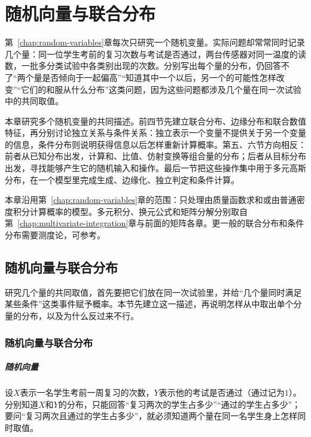 \chapter{随机向量与联合分布}
\label{chap:random-vectors}
\label{chap:probability-theory}

第~\ref{chap:random-variables}章每次只研究一个随机变量。实际问题却常常同时记录几个量：同一位学生考前的复习次数与考试是否通过，两台传感器对同一温度的读数，一批多分类试验中各类别出现的次数。分别写出每个量的分布，仍回答不了“两个量是否倾向于一起偏高”“知道其中一个以后，另一个的可能性怎样改变”“它们的和服从什么分布”这类问题，因为这些问题都涉及几个量在同一次试验中的共同取值。

本章研究多个随机变量的共同描述。前四节先建立联合分布、边缘分布和联合数值特征，再分别讨论独立关系与条件关系：独立表示一个变量不提供关于另一个变量的信息，条件分布则说明获得信息以后怎样重新计算概率。第五、六节方向相反：前者从已知分布出发，计算和、比值、仿射变换等组合量的分布；后者从目标分布出发，寻找能够产生它的随机输入和操作。最后一节把这些操作集中用于多元高斯分布，在一个模型里完成生成、边缘化、独立判定和条件计算。

本章沿用第~\ref{chap:random-variables}章的范围：只处理由质量函数求和或由普通密度积分计算概率的模型。多元积分、换元公式和矩阵分解分别取自第~\ref{chap:multivariate-integration}章与前面的矩阵各章。更一般的联合分布和条件分布需要测度论，可参考。

\section{随机向量与联合分布}
\label{sec:rvec-joint}

研究几个量的共同取值，首先要把它们放在同一次试验里，并给“几个量同时满足某些条件”这类事件赋予概率。本节先建立这一描述，再说明怎样从中取出单个分量的分布，以及为什么反过来不行。

\subsection{随机向量与联合分布}

\paragraph{随机向量}
设$X$表示一名学生考前一周复习的次数，$Y$表示他的考试是否通过（通过记为$1$）。分别知道$X$和$Y$的分布，只能回答“复习两次的学生占多少”“通过的学生占多少”；要问“复习两次且通过的学生占多少”，就必须知道两个量在同一名学生身上怎样同时取值。

